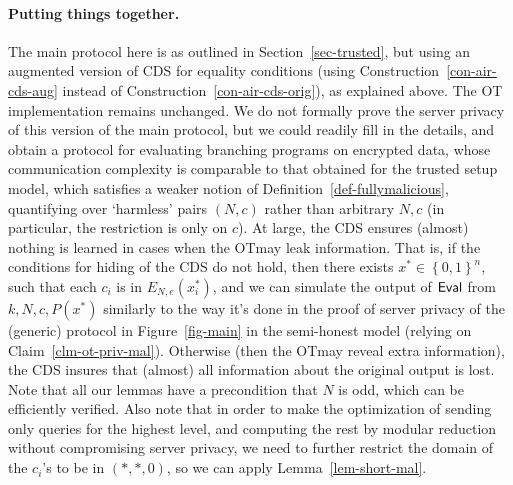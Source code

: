 \documentclass{article}
\newcommand{\encdj}{{E}_{N,e}}
\newcommand{\set}[1]{\left\{#1\right\}}
\newcommand{\bools}[1][]{{\set{0,1}}^{#1}}
\newcommand{\eval}{{\sf Eval}}
\newcommand{\ot}{\mbox{OT}\;}
\begin{document}
\paragraph{Putting things together.}
The main protocol here is as outlined in Section~\ref{sec-trusted}, but using an augmented version of CDS for equality conditions
(using Construction~\ref{con-air-cds-aug} instead of Construction~\ref{con-air-cds-orig}), as explained above. The OT implementation remains unchanged.
We do not formally prove the server privacy of this version of the main protocol, but we could readily fill in the details, and obtain a protocol
for evaluating branching programs on encrypted data, whose communication complexity is comparable
to that obtained for the trusted setup model, which satisfies a weaker notion of Definition~\ref{def-fullymalicious}, quantifying over `harmless' pairs $(N,c)$ rather than arbitrary $N,c$ (in particular, the restriction is only on $c$). At large, the CDS ensures (almost) nothing is learned in cases when the \ot may leak information.
That is, if the conditions for hiding of the CDS do not hold,
then there exists $x^*\in\bools[n]$, such that each $c_i$ is in $\encdj(x^*_i)$, and we can simulate
the output of $\eval$ from $k,N,c,P(x^*)$ similarly to the way it's done in the proof of server privacy of
the (generic) protocol in Figure~\ref{fig-main} in the semi-honest model
(relying on Claim~\ref{clm-ot-priv-mal}). Otherwise (then the \ot may reveal extra information), the CDS insures that (almost) all information about the original output is lost.
Note that all our lemmas have a precondition that $N$ is odd, which can be efficiently verified.
Also note that in order to make the optimization of sending only queries for the highest level, and computing the rest by modular reduction without compromising server privacy, we need to further restrict the domain of the $c_i$'s to be in $(*,*,0)$, so we can apply Lemma~\ref{lem-short-mal}.
\end{document}
